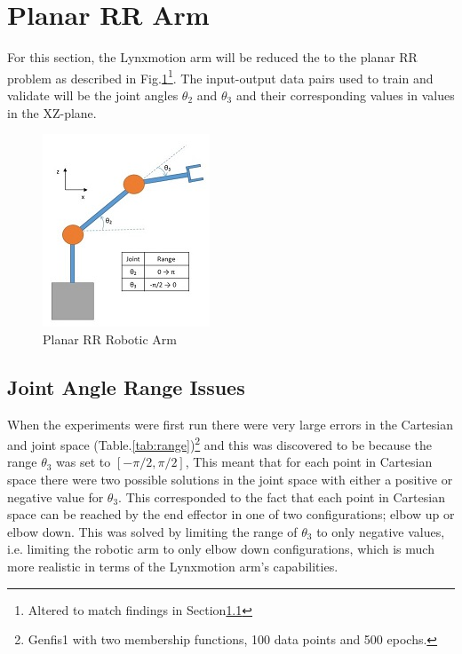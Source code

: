 \documentclass[11.5pt, twoside, a4paper]{article}
\begin{document}
\section{Planar RR Arm}

For this section, the Lynxmotion arm will be reduced the to the planar RR problem as described in Fig.\ref{fig:2Link}\footnote{Altered to match findings in Section\ref{sec:elbowIssues}}. The input-output data pairs used to train and validate will be the joint angles $\theta_2$ and $\theta_3$ and their corresponding values in values in the XZ-plane.

\begin{figure} %
\begin{center}
\includegraphics{2Link.jpg}
\caption{Planar RR Robotic Arm \label{fig:2Link}}
\end{center}
\end{figure}

\subsection{Joint Angle Range Issues} \label{sec:elbowIssues}

When the experiments were first run there were very large errors in the Cartesian and joint space (Table.\ref{tab:range})\footnote{Genfis1 with two membership functions, 100 data points and 500 epochs.} and this was discovered to be because the range $\theta_3$ was set to $\left[-\pi/2,\pi/2\right]$, This meant that for each point in Cartesian space there were two possible solutions in the joint space with either a positive or negative value for $\theta_3$. This corresponded to the fact that each point in Cartesian space can be reached by the end effector in one of two configurations; elbow up or elbow down. This was solved by limiting the range of $\theta_3$ to only negative values, i.e. limiting the robotic arm to only elbow down configurations, which is much more realistic in terms of the Lynxmotion arm's capabilities.
\end{document}
